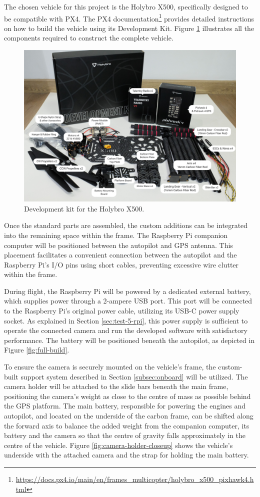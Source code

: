 The chosen vehicle for this project is the Holybro X500, specifically designed to be compatible with PX4. The PX4 documentation\footnote{\url{https://docs.px4.io/main/en/frames_multicopter/holybro_x500_pixhawk4.html}} provides detailed instructions on how to build the vehicle using its Development Kit. Figure \ref{fig:x500-dev-kit} illustrates all the components required to construct the complete vehicle.

\begin{figure}[H]
  \centering
  \includegraphics[width=.7\textwidth, keepaspectratio]{img/x500-dev-kit.jpg}
  \caption{Development kit for the Holybro X500.}
  \label{fig:x500-dev-kit}
\end{figure}


Once the standard parts are assembled, the custom additions can be integrated into the remaining space within the frame. The Raspberry Pi companion computer will be positioned between the autopilot and GPS antenna. This placement facilitates a convenient connection between the autopilot and the Raspberry Pi's I/O pins using short cables, preventing excessive wire clutter within the frame. 

During flight, the Raspberry Pi will be powered by a dedicated external battery, which supplies power through a 2-ampere USB port. This port will be connected to the Raspberry Pi's original power cable, utilizing its USB-C power supply socket. As explained in Section \ref{sec:test-5-rpi}, this power supply is sufficient to operate the connected camera and run the developed software with satisfactory performance. The battery will be positioned beneath the autopilot, as depicted in Figure \ref{fig:full-build}. 


To ensure the camera is securely mounted on the vehicle's frame, the custom-built support system described in Section \ref{subsec:onboard} will be utilized. The camera holder will be attached to the slide bars beneath the main frame, positioning the camera's weight as close to the centre of mass as possible behind the GPS platform. The main battery, responsible for powering the engines and autopilot, and located on the underside of the carbon frame, can be shifted along the forward axis to balance the added weight from the companion computer, its battery and the camera so that the centre of gravity falls approximately in the centre of the vehicle. Figure \ref{fig:camera-holder-closeup} shows the vehicle's underside with the attached camera and the strap for holding the main battery.


